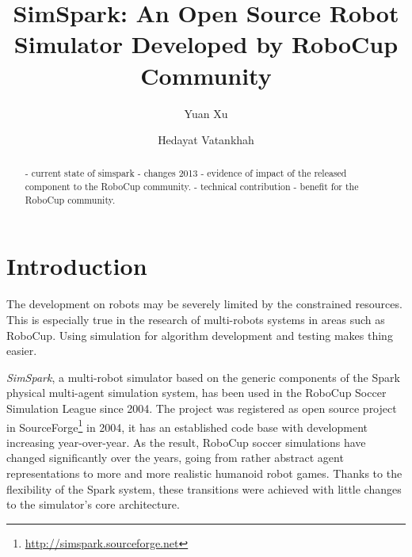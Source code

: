 \documentclass{llncs}
\begin{document}
\title{SimSpark: An Open Source Robot Simulator Developed by RoboCup Community}

\author{Yuan Xu \and Hedayat Vatankhah}


\maketitle

\begin{abstract}
  - current state of simspark
  - changes 2013
  - evidence of impact of the released component to the RoboCup community.
  - technical contribution
  - benefit for the RoboCup community.
\end{abstract}

\section{Introduction}
The development on robots may be severely limited by the constrained resources.
This is especially true in the research of multi-robots systems in areas such as RoboCup.
Using simulation for algorithm development and testing makes thing easier.

\textit{SimSpark}, a multi-robot simulator based on the generic components of the Spark\cite{OR05} physical multi-agent simulation system, has been used in the RoboCup Soccer Simulation League since 2004.
The project was registered as open source project in SourceForge\footnote{\url{http://simspark.sourceforge.net}} in 2004, it has an established code base with development increasing year-over-year.
As the result, RoboCup soccer simulations have changed significantly over the years, going from rather abstract agent representations to more and more realistic humanoid robot games\cite{Boedecker2008,usermanual}.
Thanks to the flexibility of the Spark system, these transitions were achieved with little changes to the simulator’s core architecture.
\end{document}
